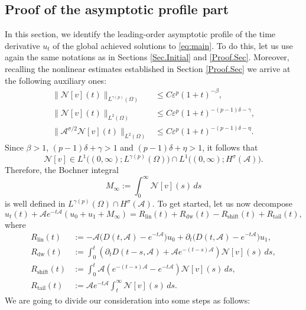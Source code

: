 \documentclass[a4paper,11pt]{article} %
\theoremstyle{remark}
\theoremstyle{definition}
\numberwithin{equation}{section}
\begin{document}
\subsection{Proof of the asymptotic profile part} \label{sec:diffusion-profile}
In this section, we identify the leading-order asymptotic profile of the time derivative \(u_t\) of the global achieved solutions to \eqref{eq:main}. To do this, let us use again the same notations as in Sections \ref{Sec.Initial} and \ref{Proof.Sec}. Moreover, recalling the nonlinear estimates established in Section \ref{Proof.Sec} we arrive at the following auxiliary ones:
\begin{align}
\label{eq:F-Lq-decay}
\big\|\mathcal{N}[v](t)\big\|_{L^{\gamma(p)}(\Omega)}
&\le
C\varepsilon^p(1+t)^{-\beta},\\
\label{eq:F-L2-decay}
\big\|\mathcal{N}[v](t)\big\|_{L^2(\Omega)}
&\le
C\varepsilon^p(1+t)^{-(p-1)\delta-\gamma},\\
\label{eq:F-Hsigma-decay}
\big\|\mathcal{A}^{\sigma/2}\mathcal{N}[v](t)\big\|_{L^2(\Omega)}
&\le
C\varepsilon^p(1+t)^{-(p-1)\delta-\eta}.
\end{align}
Since $\beta>1$, $(p-1)\delta+\gamma>1$ and $(p-1)\delta+\eta>1$, it follows that
\[
\mathcal{N}[v]
\in
L^1\Big((0,\infty);L^{\gamma(p)}(\Omega)\Big)
\cap
L^1\Big((0,\infty);H^\sigma(\mathcal{A})\Big).
\]
Therefore, the Bochner integral
\begin{equation*}
\label{eq:nonlinear-asymptotic-data}
M_\infty
:=
\int_0^\infty \mathcal{N}[v](s)\,ds
\end{equation*}
is well defined in $L^{\gamma(p)}(\Omega)\cap H^\sigma(\mathcal{A})$. To get started, let us now decompose
\begin{equation}
\label{eq:ut-profile-decomposition}
u_t(t)+\mathcal{A}e^{-t\mathcal{A}}(u_0+u_1+M_\infty)
=
R_{\mathrm{lin}}(t)
+
R_{\mathrm{dw}}(t)
-
R_{\mathrm{shift}}(t)
+
R_{\mathrm{tail}}(t),
\end{equation}
where
\begin{align*}
R_{\mathrm{lin}}(t)
&:=
-\mathcal{A}\bigl(D(t,\mathcal{A})-e^{-t\mathcal{A}}\bigr)u_0
+
\partial_t\bigl(D(t,\mathcal{A})-e^{-t\mathcal{A}}\bigr)u_1,\\
R_{\mathrm{dw}}(t)
&:=
\int_0^t
\left(
\partial_tD(t-s,\mathcal{A})
+
\mathcal{A}e^{-(t-s)\mathcal{A}}
\right)\mathcal{N}[v](s)\,ds,\\
R_{\mathrm{shift}}(t)
&:=
\int_0^t
\mathcal{A}\left(
e^{-(t-s)\mathcal{A}}-e^{-t\mathcal{A}}
\right)\mathcal{N}[v](s)\,ds,\\
R_{\mathrm{tail}}(t)
&:=
\mathcal{A}e^{-t\mathcal{A}}\int_t^\infty \mathcal{N}[v](s)\,ds.
\end{align*}
We are going to divide our consideration into some steps as follows:\medskip
\end{document}
